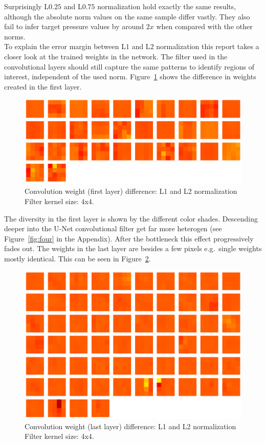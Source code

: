 \documentclass[acmtog]{techreportacmart}
\begin{document}
Surprisingly L$0.25$ and L$0.75$ normalization hold exactly the same results, although the absolute 
norm values on the same sample differ vastly. They also fail to infer target pressure values by 
around $2x$ when compared with the other norms. \\
To explain the error margin between L$1$ and L$2$ normalization this report takes a closer look 
at the trained weights in the network. The filter used in the convolutional layers should still 
capture the same patterns to identify regions of interest, independent of the used norm. 
Figure~\ref{fig:seven} shows the  difference in weights created in the first layer. 

\begin{figure}[H]
  \includegraphics[width=.3\textwidth]{figures/weights_visualized/diff_layer_1_conv.png}
  \caption{Convolution weight (first layer) difference: L1 and L2 normalization \\ Filter kernel size: 4x4.}
  \label{fig:seven}
\end{figure}

The diversity in the first layer is shown by the different color shades. Descending deeper into 
the U-Net convolutional filter get far more heterogen (see Figure~\ref{fig:four} in the Appendix). 
After the bottleneck this effect progressively fades out. The weights in the last layer are 
besides a few pixels e.g.\ single weights mostly identical. This can be seen in Figure~\ref{fig:eight}.

\begin{figure}[H]
  \includegraphics[width=.3\textwidth]{figures/weights_visualized/diff_layer_14_conv.png}
  \caption{Convolution weight (last layer) difference: L1 and L2 normalization \\ Filter kernel size: 4x4.}
  \label{fig:eight}
\end{figure}
\end{document}
